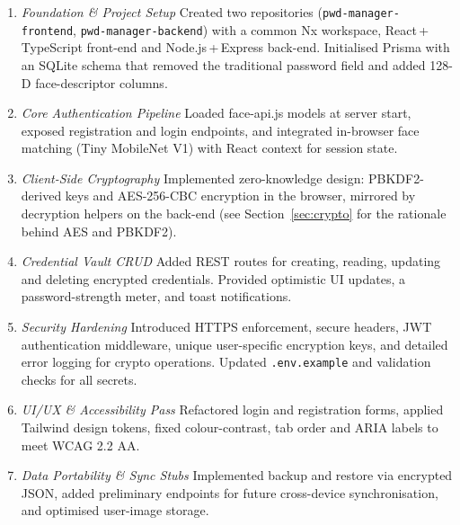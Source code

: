 \begin{enumerate}[label=\textbf{Phase~\arabic*:}, leftmargin=2.8em]

  \item \emph{Foundation \& Project Setup}  
        Created two repositories (\texttt{pwd-manager-frontend}, \texttt{pwd-manager-backend}) with a common Nx
        workspace, React\,+\,TypeScript front-end and Node.js\,+\,Express back-end.
        Initialised Prisma with an SQLite schema that removed the traditional password field
        and added 128-D face-descriptor columns.

  \item \emph{Core Authentication Pipeline}  
        Loaded face-api.js models at server start, exposed registration and login endpoints, and
        integrated in-browser face matching (Tiny MobileNet V1) with React context for
        session state.

  \item \emph{Client-Side Cryptography}  
        Implemented zero-knowledge design: PBKDF2-derived keys and AES-256-CBC encryption
        in the browser, mirrored by decryption helpers on the back-end
        (see Section~\ref{sec:crypto} for the rationale behind AES and PBKDF2).

  \item \emph{Credential Vault CRUD}  
        Added REST routes for creating, reading, updating and deleting encrypted credentials.
        Provided optimistic UI updates, a password-strength meter, and toast notifications.

  \item \emph{Security Hardening}  
        Introduced HTTPS enforcement, secure headers, JWT authentication middleware,
        unique user-specific encryption keys, and detailed error logging for crypto
        operations. Updated \texttt{.env.example} and validation checks for all secrets.

  \item \emph{UI/UX \& Accessibility Pass}  
        Refactored login and registration forms, applied Tailwind design tokens, fixed colour-contrast,
        tab order and ARIA labels to meet WCAG 2.2 AA.

  \item \emph{Data Portability \& Sync Stubs}  
        Implemented backup and restore via encrypted JSON, added preliminary endpoints for
        future cross-device synchronisation, and optimised user-image storage.

\end{enumerate}

